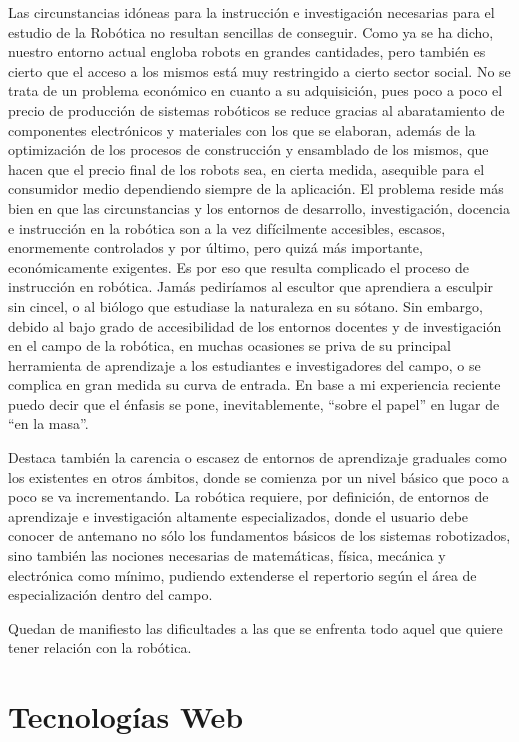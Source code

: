 Las circunstancias idóneas para la instrucción e investigación necesarias para el estudio de la Robótica no resultan sencillas de conseguir. Como ya se ha dicho, nuestro entorno actual engloba robots en grandes cantidades, pero también es cierto que el acceso a los mismos está muy restringido a cierto sector social. No se trata de un problema económico en cuanto a su adquisición, pues poco a poco el precio de producción de sistemas robóticos se reduce gracias al abaratamiento de componentes electrónicos y materiales con los que se elaboran, además de la optimización de los procesos de construcción y ensamblado de los mismos, que hacen que el precio final de los robots sea, en cierta medida, asequible para el consumidor medio dependiendo siempre de la aplicación. El problema reside más bien en que las circunstancias y los entornos de desarrollo, investigación, docencia e instrucción en la robótica son a la vez difícilmente accesibles, escasos, enormemente controlados y por último, pero quizá más importante, económicamente exigentes. Es por eso que resulta complicado el proceso de instrucción en robótica. Jamás pediríamos al escultor que aprendiera a esculpir sin cincel, o al biólogo que estudiase la naturaleza en su sótano. Sin embargo, debido al bajo grado de accesibilidad de los entornos docentes y de investigación en el campo de la robótica, en muchas ocasiones se priva de su principal herramienta de aprendizaje a los estudiantes e investigadores del campo, o se complica en gran medida su curva de entrada. En base a mi experiencia reciente puedo decir que el énfasis se pone, inevitablemente, ``sobre el papel'' en lugar de ``en la masa''.

Destaca también la carencia o escasez de entornos de aprendizaje graduales como los existentes en otros ámbitos, donde se comienza por un nivel básico que poco a poco se va incrementando. La robótica requiere, por definición, de entornos de aprendizaje e investigación altamente especializados, donde el usuario debe conocer de antemano no sólo los fundamentos básicos de los sistemas robotizados, sino también las nociones necesarias de matemáticas, física, mecánica y electrónica como mínimo, pudiendo extenderse el repertorio según el área de especialización dentro del campo.

Quedan de manifiesto las dificultades a las que se enfrenta todo aquel que quiere tener relación con la robótica.

\section{Tecnologías Web}

